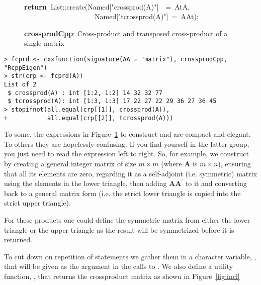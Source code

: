 \documentclass[shortnames,article]{jss}
\newcommand{\hlstd}[1]{\textcolor[rgb]{0,0,0}{#1}}
\newcommand{\hlopt}[1]{\textcolor[rgb]{0,0,0}{#1}}
\newcommand{\hlstr}[1]{\textcolor[rgb]{0.90,0.15,0.15}{#1}}
\newcommand{\hlkwa}[1]{\textcolor[rgb]{0.61,0.13,0.93}{\bf{#1}}}
\newcommand{\hlkwd}[1]{\textcolor[rgb]{0,0,0}{#1}}
\begin{document}
\begin{figure}[htb]
    \hlstd{}\hspace*{\fill}\\
    \hlkwa{return\ }\hlstd{List}\hlopt{::}\hlstd{}\hlkwd{create}\hlstd{}\hlopt{(}\hlstd{Named}\hlopt{{[}}\hlstd{}\hlstr{"crossprod(A)"}\hlstd{}\hlopt{{]}}\hlstd{\ \ }\hlopt{=\ }\hlstd{AtA}\hlopt{,}\hspace*{\fill}\\
    \hlstd{}\hlstd{\ \ \ \ \ \ \ \ \ \ \ \ \ \ \ \ \ \ \ \ }\hlstd{Named}\hlopt{{[}}\hlstd{}\hlstr{"tcrossprod(A)"}\hlstd{}\hlopt{{]}\ =\ }\hlstd{AAt}\hlopt{);}\hlstd{}\hspace*{\fill}
    \normalfont
    \normalsize
  \caption{\textbf{crossprodCpp}: Cross-product and transposed cross-product of a single matrix}
  \label{crossprod}
\end{figure}
\begin{verbatim}
> fcprd <- cxxfunction(signature(AA = "matrix"), crossprodCpp, "RcppEigen")
> str(crp <- fcprd(A))
List of 2
 $ crossprod(A) : int [1:2, 1:2] 14 32 32 77
 $ tcrossprod(A): int [1:3, 1:3] 17 22 27 22 29 36 27 36 45
> stopifnot(all.equal(crp[[1]], crossprod(A)),
+           all.equal(crp[[2]], tcrossprod(A)))
\end{verbatim}

To some, the expressions in Figure~\ref{crossprod} to construct
 and  are compact and elegant.  To others they are
hopelessly confusing.  If you find yourself in the latter group, you
just need to read the expression left to right.  So, for example, we
construct  by creating a general integer matrix of size
$m\times m$ (where $\bm A$ is $m\times n$), ensuring that all its
elements are zero, regarding it as a self-adjoint (i.e. symmetric) matrix
using the elements in the lower triangle, then adding $\bm A\bm A^\prime$
to it and converting back to a general matrix form (i.e. the strict lower
triangle is copied into the strict upper triangle).

For these products one could define the symmetric matrix from either
the lower triangle or the upper triangle as the result will be
symmetrized before it is returned.

To cut down on repetition of  statements we gather them in
a character variable, , that will be given as the  argument
in the calls to .  We also define a utility
function, , that returns the crossproduct matrix as shown in Figure~\ref{fig:incl}
\end{document}
